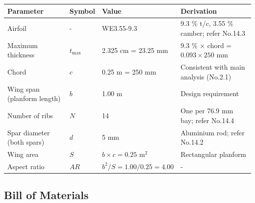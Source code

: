 \documentclass[10pt,a4paper]{article}
\begin{document}
\begin{center}
\renewcommand{\arraystretch}{1.2}
\begin{tabularx}{\textwidth}{|p{3.5cm}|p{2cm}|p{3cm}|X|}
\hline
Parameter & Symbol & Value & Derivation \\
\hline
Airfoil & - & WE3.55-9.3 & 9.3 \% t/c, 3.55 \% camber; refer No.14.3 \\
\hline
Maximum thickness & $t_{\max}$ & 2.325 cm = 23.25 mm & 9.3 \% $\times$ chord = $0.093 \times 250$ mm \\
\hline
Chord & $c$ & 0.25 m = 250 mm & Consistent with main analysis (No.2.1) \\
\hline
Wing span (planform length) & $b$ & 1.00 m & Design requirement \\
\hline
Number of ribs & $N$ & 14 & One per 76.9 mm bay; refer No.14.4 \\
\hline
Spar diameter (both spars) & $d$ & 5 mm & Aluminium rod; refer No.14.2 \\
\hline
Wing area & $S$ & $b \times c = 0.25$ m$^{2}$ & Rectangular planform \\
\hline
Aspect ratio & $AR$ & $b^{2} / S = 1.00 / 0.25 = 4.00$ & - \\
\hline
\end{tabularx}
\end{center}

\subsection{Bill of Materials}
\end{document}
